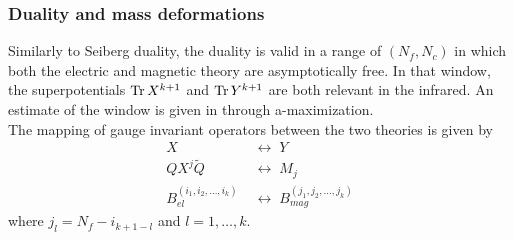 \subsubsection{Duality and mass deformations}
Similarly to Seiberg duality, the duality is valid in a range of $(N_f,N_c)$ in which both the electric and magnetic theory are asymptotically free. 
In that window, the superpotentials $\mathrm{Tr } \, X^{k+1}$ and $\mathrm{Tr } \, Y^{k+1}$ are both relevant in the infrared.
An estimate of the window is given in \cite{Kutasov:2003iy} through a-maximization.  \\
The mapping of gauge invariant operators between the two theories is given by
\begin{equation}
\begin{aligned}
X \; & \longleftrightarrow \; Y \\
Q X^j \tilde{Q} \; & \longleftrightarrow  \; M_j \\
B^{(i_1, i_2, \dotsc, i_k)}_{el} \; & \longleftrightarrow \; B_{mag}^{(j_1, j_2 ,\dotsc, j_k) }  
\end{aligned}
\end{equation}
where $j_l = N_f - i_{k+1-l} $ and $ l = 1,\dotsc,k $.

